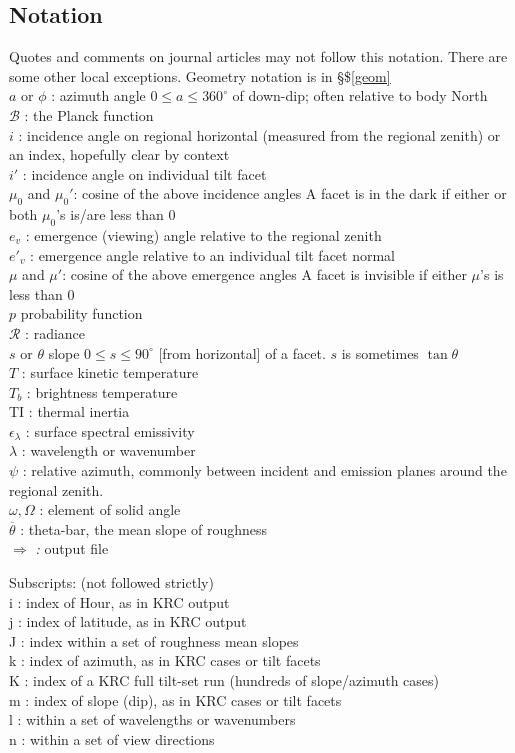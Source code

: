 \documentclass{article}
\newcommand{\qfo}[1]{$\Longrightarrow$ \textit{#1}} %
\begin{document}
\subsection{Notation \label{nota} }
Quotes and comments on journal articles may not follow this notation. There are some other local exceptions.
Geometry notation is in \S \$\ref{geom}
\\ $a$ or $\phi$ : azimuth angle  $0 \leq a \leq 360^\circ $ of down-dip; often relative to body North
\\ $\mathcal{B}$ :  the Planck function
\\ $i$ : incidence angle on regional horizontal (measured from the regional zenith)
\qii  or an index, hopefully clear by context
\\ $i'$ : incidence angle on individual tilt facet
\\ $\mu_0$ and $\mu_0'$: cosine of the above incidence angles
\qi  A facet is in the dark if either or both $\mu_0$'s is/are less than 0
\\ $e_v$ : emergence (viewing) angle relative to the regional zenith
\\ $e'_v$ :  emergence angle relative to an individual tilt facet normal
\\ $\mu$ and $\mu'$: cosine of the above emergence angles
\qi  A facet is invisible if either $\mu$'s is less than 0 
\\ $p$ probability function
\\ $\mathcal{R}$ : radiance
\\ $s$ or $\theta$ slope  $0 \leq s \leq 90^\circ $ [from horizontal] of a facet. $s$ is sometimes $\tan \theta$
\\ $T$ : surface kinetic temperature
\\ $T_b$ : brightness temperature
\\ TI : thermal inertia
\\ $\epsilon_\lambda$ : surface spectral emissivity 
\\ $\lambda$ :  wavelength or wavenumber
\\ $\psi$ : relative azimuth, commonly between incident and emission planes around the regional zenith.
\\ $\omega, \Omega$ : element of solid angle
\\ $\overline{\theta}$ : theta-bar, the mean slope of roughness
\\ \qfo : output file

Subscripts: (not followed strictly)
\\ i : index of Hour, as in KRC output
\\ j : index of latitude,  as in KRC output
\\ J : index within a set of roughness mean slopes
\\ k : index of azimuth, as in KRC cases or tilt facets
\\ K : index of a KRC full tilt-set run (hundreds of slope/azimuth cases)
\\ m : index of slope (dip), as in KRC cases or tilt facets 
\\ l : within a set of wavelengths or wavenumbers
\\ n : within a set of view directions 
\end{document}
